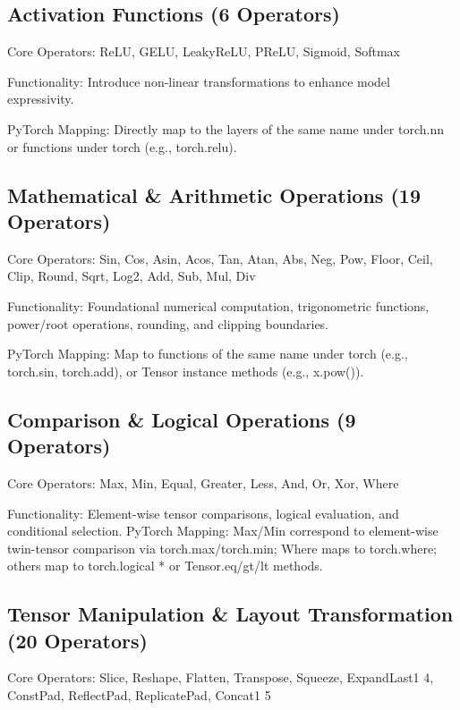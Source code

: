 \documentclass[
  10
]{article}
\begin{document}
\subsection{Activation Functions (6
Operators)}\label{activation-functions-6-operators}

Core Operators: ReLU, GELU, LeakyReLU, PReLU, Sigmoid, Softmax

Functionality: Introduce non-linear transformations to enhance model
expressivity.

PyTorch Mapping: Directly map to the layers of the same name under
torch.nn or functions under torch (e.g., torch.relu).

\subsection{Mathematical \& Arithmetic Operations (19
Operators)}\label{mathematical-arithmetic-operations-19-operators}

Core Operators: Sin, Cos, Asin, Acos, Tan, Atan, Abs, Neg, Pow, Floor,
Ceil, Clip, Round, Sqrt, Log2, Add, Sub, Mul, Div

Functionality: Foundational numerical computation, trigonometric
functions, power/root operations, rounding, and clipping boundaries.

PyTorch Mapping: Map to functions of the same name under torch (e.g.,
torch.sin, torch.add), or Tensor instance methods (e.g., x.pow()).

\subsection{Comparison \& Logical Operations (9
Operators)}\label{comparison-logical-operations-9-operators}

Core Operators: Max, Min, Equal, Greater, Less, And, Or, Xor, Where

Functionality: Element-wise tensor comparisons, logical evaluation, and
conditional selection. PyTorch Mapping: Max/Min correspond to
element-wise twin-tensor comparison via torch.max/torch.min; Where maps
to torch.where; others map to torch.logical * or Tensor.eq/gt/lt
methods.

\subsection{Tensor Manipulation \& Layout Transformation (20
Operators)}\label{tensor-manipulation-layout-transformation-20-operators}

Core Operators: Slice, Reshape, Flatten, Transpose, Squeeze, ExpandLast1
4, ConstPad, ReflectPad, ReplicatePad, Concat1 5
\end{document}
